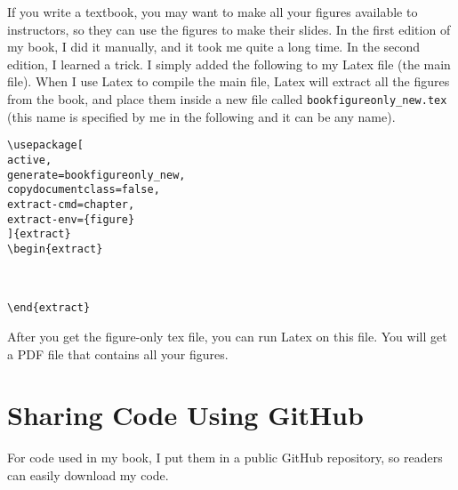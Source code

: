 If you write a textbook, you may want to make all your figures available to
instructors, so they can use the figures to make their slides. In the first
edition of my book, I did it manually, and it took me quite a long time. 
In the second edition, I learned a
trick. I simply added the following to my Latex file (the main file). 
When I use Latex to compile the main file, Latex will extract all the 
figures from the book, and place them inside a new file 
called \texttt{bookfigureonly\_new.tex} (this name is 
specified by me in the following and it can be any name).




\begin{lstlisting}
\usepackage[
active,
generate=bookfigureonly_new,
copydocumentclass=false,
extract-cmd=chapter,
extract-env={figure}
]{extract}
\begin{extract}



\end{extract}
\end{lstlisting}

After you get the figure-only tex file, you can run 
Latex on this file. You will get a PDF file that contains
all your figures. 
 

\section{Sharing Code Using GitHub}

For code used in my book, I put them in a public GitHub repository, so
readers can easily download my code.

